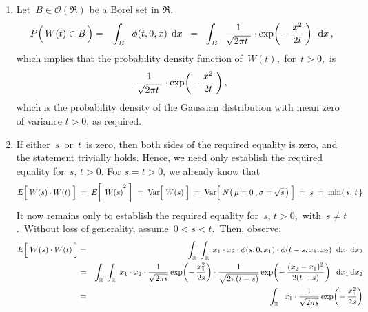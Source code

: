 \begin{enumerate}
\item
	Let \,$B \in \mathcal{O}(\Re)$ be a Borel set in $\Re$.
	\begin{eqnarray*}
	P\!\left(\,W(t) \overset{{\color{white}.}}{\in} B\,\right)
	& = &
		\int_{B}\;\;
			\phi(t,0,x)
		\;\,\d x
	\;\; = \;\;
		\int_{B}\;\;
			\dfrac{1}{\sqrt{2\pi t{\color{white}.}}}
			\cdot
			\exp\!\left(\,-\,\dfrac{x^{2}}{2 t}\,\right)
		\;\,\d x\,,
	\end{eqnarray*}
	which implies that the probability density function of \,$W(t)$,\, for \,$t > 0$,\, is
	\begin{equation*}
		\dfrac{1}{\sqrt{2\pi t{\color{white}.}}}
		\cdot
		\exp\!\left(\,-\,\dfrac{x^{2}}{2 t}\,\right),
	\end{equation*}
	which is the probability density of the Gaussian distribution with mean zero of variance $t > 0$, as required.
\item
	If either \,$s$\, or \,$t$\, is zero, then both sides of the required equality is zero, and the statement trivially holds.
	Hence, we need only establish the required equality for \,$s,\, t > 0$.
	\vskip 0.2cm
	\noindent
	For $s = t > 0$, we already know that
	\begin{equation*}
	E\!\left[\;\overset{{\color{white}.}}{W(s)} \cdot W(t)\;\right]
	\;=\; E\!\left[\;\,\overset{{\color{white}.}}{W(s)}^{2}\;\right]
	\;=\; \Var\!\left[\;\overset{{\color{white}.}}{W(s)} \;\right]
	\;=\; \Var\!\left[\; \overset{{\color{white}.}}{N\!\left(\,\mu = 0 \,\overset{{\color{white}1}}{,}\, \sigma = \sqrt{s}\,\right)} \;\right]
	\;=\; s
	\;=\; \min\{\,s,\,t\,\}
	\end{equation*}
	It now remains only to establish the required equality for \,$s,\, t >0$,\, with \,$s \neq t$.\,
	Without loss of generality, assume \,$0< s < t$.\,
	Then, observe:
	\begin{eqnarray*}
	E\!\left[\;\overset{{\color{white}.}}{W(s)} \cdot W(t)\;\right]
	& = &
		\int_{\Re} \; \int_{\Re}\;
			x_{1} \cdot x_{2} 
			\cdot
			\phi(s,0,x_{1})
			\cdot
			\phi(t - s,x_{1},x_{2})
		\;\;\d x_{1}\,\d x_{2}
	\\
	& = &
		\int_{\Re} \; \int_{\Re}\;
			x_{1} \cdot x_{2} 
			\cdot
			\dfrac{1}{\sqrt{2\pi s}}\exp\!\left(-\,\dfrac{x_{1}^{2}}{2s}\right)
			\cdot
			\dfrac{1}{\sqrt{2\pi(t-s)}}\exp\!\left(-\,\dfrac{(x_{2}-x_{1})^{2}}{2(t-s)}\right)
		\;\;\d x_{1}\,\d x_{2}
	\\
	& = &
		\int_{\Re}\;\;
			x_{1} \cdot
			\dfrac{1}{\sqrt{2\pi s}}\exp\!\left(-\,\dfrac{x_{1}^{2}}{2s}\right)

\end{eqnarray*}
\end{enumerate}
